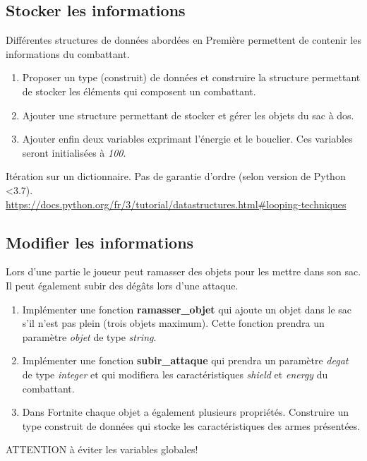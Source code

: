 \documentclass[a4paper,11pt]{article}
\begin{document}
\begin{Form}
\subsection{Stocker les informations}
Différentes structures de données abordées en Première permettent de contenir les informations du combattant.
\begin{activite}
\begin{enumerate}
\item Proposer un type (construit) de données et construire la structure permettant de stocker les éléments qui composent un combattant.
\item Ajouter une structure permettant de stocker et gérer les objets du sac à dos.
\item Ajouter enfin deux variables exprimant l'énergie et le bouclier. Ces variables seront initialisées à \emph{100}.
\end{enumerate} 
\end{activite}
\begin{commentprof}
Itération sur un dictionnaire. Pas de garantie d'ordre (selon version de Python <3.7).\\\url{https://docs.python.org/fr/3/tutorial/datastructures.html#looping-techniques}
\end{commentprof}
\subsection{Modifier les informations}
Lors d'une partie le joueur peut ramasser des objets pour les mettre dans son sac. Il peut également subir des dégâts lors d'une attaque.
\begin{activite}
\begin{enumerate}
\item Implémenter une fonction \textbf{ramasser\_objet} qui ajoute un objet dans le sac s'il n'est pas plein (trois objets maximum). Cette fonction prendra un paramètre \emph{objet} de type \emph{string}.
\item Implémenter une fonction \textbf{subir\_attaque} qui prendra un paramètre \emph{degat} de type \emph{integer} et qui modifiera les caractéristiques \emph{shield} et \emph{energy} du combattant. 
\item Dans Fortnite chaque objet a également plusieurs propriétés. Construire un type construit de données qui stocke les caractéristiques des armes présentées.
\end{enumerate}
\end{activite}
\begin{commentprof}
ATTENTION à éviter les variables globales!
\end{commentprof}
\begin{commentprof}

\end{commentprof}
\end{Form}
\end{document}
